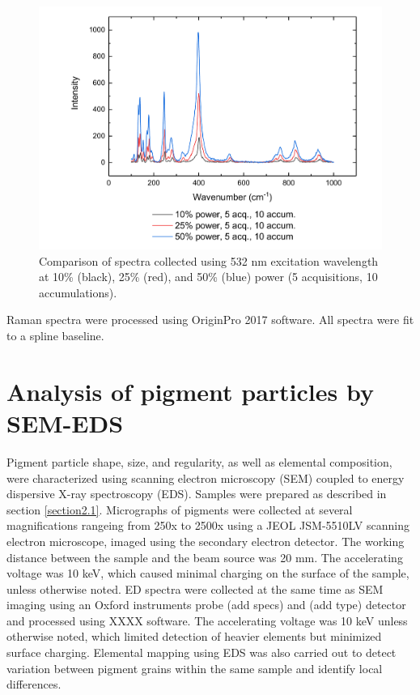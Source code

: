 \begin{figure}[H]
\centering
  \includegraphics[width=0.75\linewidth]{Az1_laserpower_comp_532}
\caption[Comparison of spectra collected using 532 nm excitation wavelength at 10\%, 25\%, and 50\% power.]{Comparison of spectra collected using 532 nm excitation wavelength at 10\% (black), 25\% (red), and 50\% (blue) power (5 acquisitions, 10 accumulations).}
\label{fig:Az1_laserpower_comp_532}
\end{figure}


Raman spectra were processed using OriginPro 2017 software. All spectra were fit to a spline baseline. %

\section[Analysis of pigment particles by SEM-EDS]{Analysis of pigment particles by SEM-EDS}
\label{section2.3}

Pigment particle shape, size, and regularity, as well as elemental composition, were characterized using scanning electron microscopy (SEM) coupled to energy dispersive X-ray spectroscopy (EDS). Samples were prepared as described in section \ref{section2.1}. Micrographs of pigments were collected at several magnifications rangeing from 250x to 2500x using a JEOL JSM-5510LV scanning electron microscope, imaged using the secondary electron detector. The working distance between the sample and the beam source was 20 mm. The accelerating voltage was 10 keV, which caused minimal charging on the surface of the sample, unless otherwise noted. ED spectra were collected at the same time as SEM imaging using an Oxford instruments probe (add specs) and (add type) detector and processed using XXXX software. The accelerating voltage was 10 keV unless otherwise noted, which limited detection of heavier elements but minimized surface charging. Elemental mapping using EDS was also carried out to detect variation between pigment grains within the same sample and identify local differences. 


